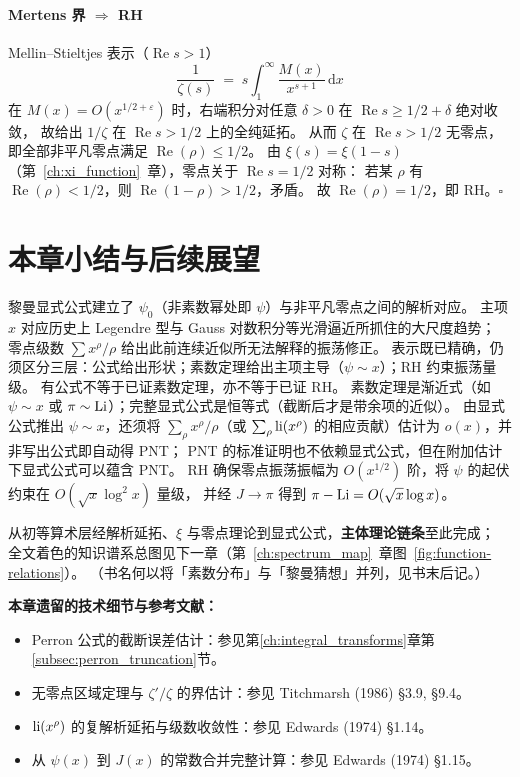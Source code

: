 \paragraph{Mertens 界 $\Rightarrow$ RH}
Mellin--Stieltjes 表示（$\operatorname{Re}s>1$）
\begin{equation}
  \frac{1}{\zeta(s)}
  \;=\;
  s\int_1^\infty\frac{M(x)}{x^{s+1}}\,\mathrm{d}x
  \label{eq:mellin_Mx}
\end{equation}
在 $M(x)=O(x^{1/2+\varepsilon})$ 时，右端积分对任意 $\delta>0$ 在 $\operatorname{Re}s\ge 1/2+\delta$ 绝对收敛，
故给出 $1/\zeta$ 在 $\operatorname{Re}s>1/2$ 上的全纯延拓。
从而 $\zeta$ 在 $\operatorname{Re}s>1/2$ 无零点，即全部非平凡零点满足 $\operatorname{Re}(\rho)\le 1/2$。
由 $\xi(s)=\xi(1-s)$（第~\ref{ch:xi_function}~章），零点关于 $\operatorname{Re}s=1/2$ 对称：
若某 $\rho$ 有 $\operatorname{Re}(\rho)<1/2$，则 $\operatorname{Re}(1-\rho)>1/2$，矛盾。
故 $\operatorname{Re}(\rho)=1/2$，即 RH。$\square$


\section*{本章小结与后续展望}\label{sec:riemann_explicit_summary}

黎曼显式公式建立了 $\psi_0$（非素数幂处即 $\psi$）与非平凡零点之间的解析对应。
主项 $x$ 对应历史上 Legendre 型与 Gauss 对数积分等光滑逼近所抓住的大尺度趋势；
零点级数 $\sum x^\rho/\rho$ 给出此前连续近似所无法解释的振荡修正。
表示既已精确，仍须区分三层：公式给出形状；素数定理给出主项主导（$\psi\sim x$）；RH 约束振荡量级。
有公式不等于已证素数定理，亦不等于已证 RH。
素数定理是渐近式（如 $\psi\sim x$ 或 $\pi\sim\operatorname{Li}$）；完整显式公式是恒等式（截断后才是带余项的近似）。
由显式公式推出 $\psi\sim x$，还须将 $\sum_{\rho}x^{\rho}/\rho$（或 $\sum_{\rho}\operatorname{li}(x^{\rho})$ 的相应贡献）估计为 $o(x)$，并非写出公式即自动得 PNT；
PNT 的标准证明也不依赖显式公式，但在附加估计下显式公式可以蕴含 PNT。
RH 确保零点振荡振幅为 $O(x^{1/2})$ 阶，将 $\psi$ 的起伏约束在 $O(\sqrt{x}\log^2 x)$ 量级，
并经 $J\to\pi$ 得到 $\pi-\operatorname{Li}=O(\sqrt{x}\log x)$。

从初等算术层经解析延拓、$\xi$ 与零点理论到显式公式，\textbf{主体理论链条}至此完成；
全文着色的知识谱系总图见下一章（第~\ref{ch:spectrum_map}~章图~\ref{fig:function-relations}）。
（书名何以将「素数分布」与「黎曼猜想」并列，见书末后记。）

\vspace{1em}
\noindent\textbf{本章遗留的技术细节与参考文献：}
\begin{itemize}
  \item Perron 公式的截断误差估计：参见第\ref{ch:integral_transforms}章第\ref{subsec:perron_truncation}节。
  \item 无零点区域定理与 $\zeta'/\zeta$ 的界估计：参见 Titchmarsh (1986) §3.9, §9.4。
  \item $\operatorname{li}(x^\rho)$ 的复解析延拓与级数收敛性：参见 Edwards (1974) §1.14。
  \item 从 $\psi(x)$ 到 $J(x)$ 的常数合并完整计算：参见 Edwards (1974) §1.15。
\end{itemize}

